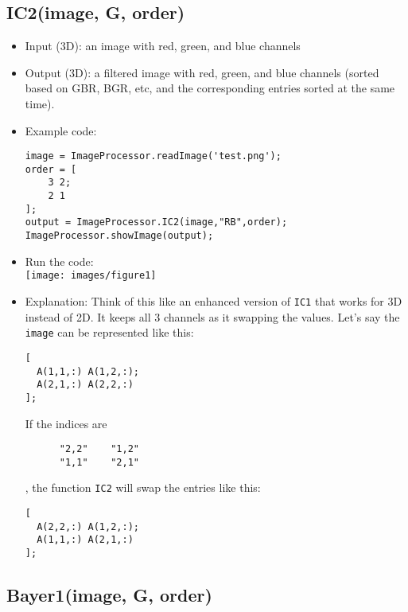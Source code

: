\documentclass[11pt]{amsart}
\theoremstyle{remark}
\theoremstyle{definition}
\theoremstyle{remark}
\numberwithin{equation}{section}
\begin{document}
\subsection{IC2(image, G, order)}\label{ic2image-g-order}

\begin{itemize}
\item
  Input (3D): an image with red, green, and blue channels
\item
  Output (3D): a filtered image with red, green, and blue channels
  (sorted based on GBR, BGR, etc, and the corresponding entries sorted
  at the same time).
\item
  Example code:

\begin{verbatim}
image = ImageProcessor.readImage('test.png');
order = [
    3 2;
    2 1
];
output = ImageProcessor.IC2(image,"RB",order);
ImageProcessor.showImage(output);
\end{verbatim}
\item
  Run the code:\\
  \texttt{[image: images/figure1]}\\
\item
  Explanation: Think of this like an enhanced version of \texttt{IC1}
  that works for 3D instead of 2D. It keeps all 3 channels as it
  swapping the values. Let's say the \texttt{image} can be represented
  like this:

\begin{verbatim}
[
  A(1,1,:) A(1,2,:);
  A(2,1,:) A(2,2,:)
];
\end{verbatim}

  If the indices are

\begin{verbatim}
      "2,2"    "1,2"
      "1,1"    "2,1"
\end{verbatim}

  , the function \texttt{IC2} will swap the entries like this:

\begin{verbatim}
[
  A(2,2,:) A(1,2,:);
  A(1,1,:) A(2,1,:)
];
\end{verbatim}
\end{itemize}

\subsection{Bayer1(image, G, order)}\label{bayer1image-g-order}
\end{document}
